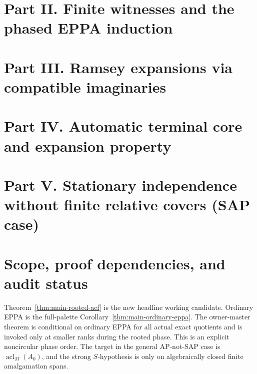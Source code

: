 \documentclass[11pt,a4paper]{article}
\theoremstyle{remark}\newtheorem{remark}[theorem]{Remark}
\theoremstyle{definition}
\theoremstyle{remark}
\begin{document}
\section*{Part II. Finite witnesses and the phased EPPA induction}









\section*{Part III. Ramsey expansions via compatible imaginaries}


\section*{Part IV. Automatic terminal core and expansion property}




\section*{Part V. Stationary independence without finite relative covers (SAP case)}



\section{Scope, proof dependencies, and audit status}
Theorem~\ref{thm:main-rooted-acf} is the new headline
working candidate.  Ordinary EPPA is the full-palette
Corollary~\ref{thm:main-ordinary-eppa}.  The owner-master
theorem is conditional on ordinary EPPA for all actual exact
quotients and is invoked only at smaller ranks during the
rooted phase.  This is an explicit noncircular phase order.  The target in the general AP-not-SAP case is
\(\operatorname{acl}_M(A_0)\), and the strong \(S\)-hypothesis is
only on algebraically closed finite amalgamation spans.
\end{document}
